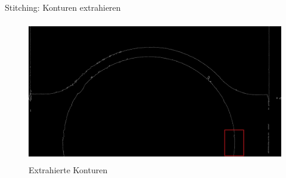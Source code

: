 \documentclass[../slides.tex]{subfiles}
\begin{document}
\begin{frame}{Stitching: Konturen extrahieren}
    \begin{figure}
        \centering
        \includegraphics[height=175pt]{img_niklas/all_cons_top_red.png}
        \caption{Extrahierte Konturen}
        \label{fig:cons}
    \end{figure}
\end{frame}
\end{document}
